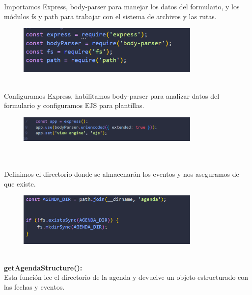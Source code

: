 \documentclass{article}
\begin{document}
Importamos Express, body-parser para manejar los datos del formulario, y los módulos fs y path para trabajar con el sistema de archivos y las rutas.
    \begin{figure}[H]
		          \centering
		          \includegraphics[width=0.8\textwidth,keepaspectratio]                       {img/modAg.png}
    \end{figure}
\\
Configuramos Express, habilitamos body-parser para analizar datos del formulario y configuramos EJS para plantillas.


     \begin{figure}[H]
		          \centering
		          \includegraphics[width=0.8\textwidth,keepaspectratio]                       {img/confExpress.png}
    \end{figure}
\\
\\Definimos el directorio donde se almacenarán los eventos y nos aseguramos de que existe.
    \begin{figure}[H]
		          \centering
		          \includegraphics[width=0.8\textwidth,keepaspectratio]                       {img/confDir.png}
    \end{figure}
\\\textbf{getAgendaStructure():}
\\Esta función lee el directorio de la agenda y devuelve un objeto estructurado con las fechas y eventos.
\end{document}
